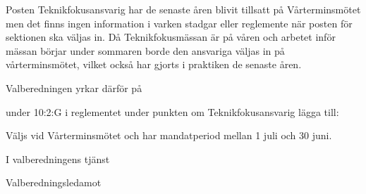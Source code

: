 \documentclass[../_main/handlingar.tex]{subfiles}
\begin{document}

Posten Teknikfokusansvarig har de senaste åren blivit tillsatt på Vårterminsmötet men det finns ingen information i varken stadgar eller reglemente när posten för sektionen ska väljas in. Då Teknikfokusmässan är på våren och arbetet inför mässan börjar under sommaren borde den ansvariga väljas in på vårterminsmötet, vilket också har gjorts i praktiken de senaste åren.

Valberedningen yrkar därför på

\begin{attsatser}
    \att under 10:2:G i reglementet under punkten om Teknikfokusansvarig lägga till:\par
    \begin{itshape}
    Väljs vid Vårterminsmötet och har mandatperiod mellan 1 juli och 30 juni.
    \end{itshape}
\end{attsatser}

\begin{signatures}{1}
    I valberedningens tjänst
    \signature{Jennifer Hagman}{Valberedningsledamot}
\end{signatures}
\end{document}
